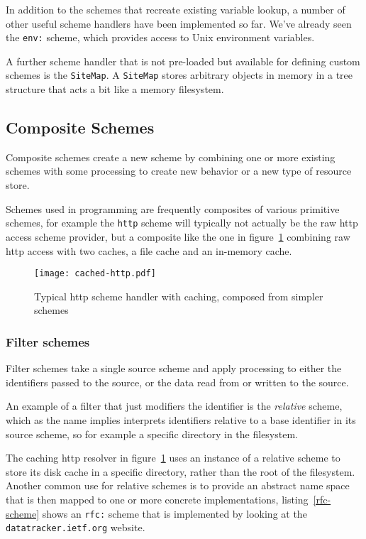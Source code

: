 \documentclass[preprint,authoryear]{acm_proc_article-sp}
\begin{document}
In addition to the schemes that recreate existing variable lookup, a number
of other useful scheme handlers have been implemented so far.  We've
already seen the {\tt env:} scheme, which provides access to Unix
environment variables.  

A further scheme handler that is not pre-loaded but available for defining
custom schemes is the {\tt SiteMap}.  A {\tt SiteMap} stores arbitrary objects
in memory in a tree structure that acts a bit like a memory filesystem.

\subsection{Composite Schemes}
\label{compositeSchemes}
Composite schemes  create a new scheme by combining one or 
more existing schemes with some processing to create new behavior
or a new type of resource store. 

 Schemes used in programming 
are frequently composites of various primitive schemes, for example
the {\tt http} scheme will typically not actually be the raw http access
scheme provider, but a composite like the one in figure~\ref{fig:http-cached} combining
raw http access with two caches, a file cache and an in-memory cache.


\begin{figure}[htbp]
\begin{center}
\texttt{[image: cached-http.pdf]}
\caption{Typical http scheme handler with caching, composed from simpler schemes}
\label{fig:http-cached}
\end{center}
\end{figure}


\subsubsection{Filter schemes}
\label{filterschemes}
Filter schemes take a single source scheme and apply processing to either
the identifiers passed to the source, or the data read from or written to the source.

An example of a filter that just modifiers the identifier is the {\em relative}
scheme, which as the name implies interprets identifiers relative to a base
identifier in its source scheme, so for example a specific directory in the
filesystem.  

The caching http resolver in figure~\ref{fig:http-cached} uses an instance
of a relative scheme to store its disk cache in a specific directory, rather
than the root of the filesystem.  Another common use for relative schemes
is to provide an abstract name space that is then mapped to one
or more  concrete implementations, listing~\ref{rfc-scheme} shows
an {\tt rfc:} scheme that is implemented by looking at the {\tt datatracker.ietf.org}
website.
\end{document}
